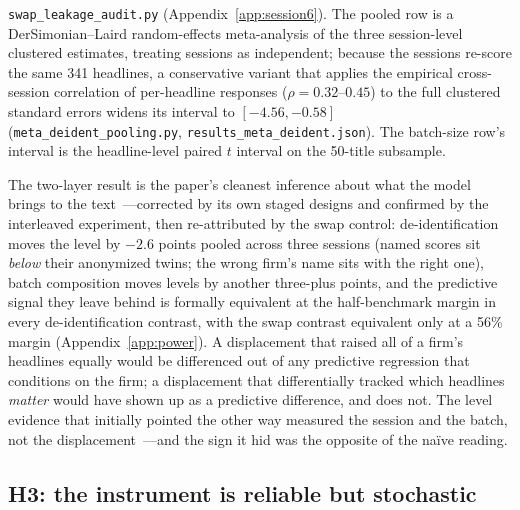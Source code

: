 \begin{table}[htbp]
\begin{threeparttable}
\begin{tablenotes}[flushleft]
\texttt{swap\_leakage\_audit.py} (Appendix~\ref{app:session6}). The pooled row is a DerSimonian--Laird random-effects meta-analysis of the three session-level clustered estimates, treating sessions as independent; because the sessions re-score the same 341 headlines, a conservative variant that applies the empirical cross-session correlation of per-headline responses ($\rho=0.32$--$0.45$) to the full clustered standard errors widens its interval to $[-4.56, -0.58]$ (\texttt{meta\_deident\_pooling.py}, \texttt{results\_meta\_deident.json}). The batch-size row's interval is the headline-level paired $t$ interval on the 50-title subsample.
\end{tablenotes}
\end{threeparttable}
\end{table}

The two-layer result is the paper's cleanest inference about what the model brings to the text~---corrected by its own staged designs and confirmed by the interleaved experiment, then re-attributed by the swap control: de-identification moves the level by $-2.6$ points pooled across three sessions (named scores sit \emph{below} their anonymized twins; the wrong firm's name sits with the right one), batch composition moves levels by another three-plus points, and the predictive signal they leave behind is formally equivalent at the half-benchmark margin in every de-identification contrast, with the swap contrast equivalent only at a 56\% margin (Appendix~\ref{app:power}). A displacement that raised all of a firm's headlines equally would be differenced out of any predictive regression that conditions on the firm; a displacement that differentially tracked which headlines \emph{matter} would have shown up as a predictive difference, and does not. The level evidence that initially pointed the other way measured the session and the batch, not the displacement~---and the sign it hid was the opposite of the naïve reading.

\subsection{H3: the instrument is reliable but stochastic}\label{sec:results:h3}

